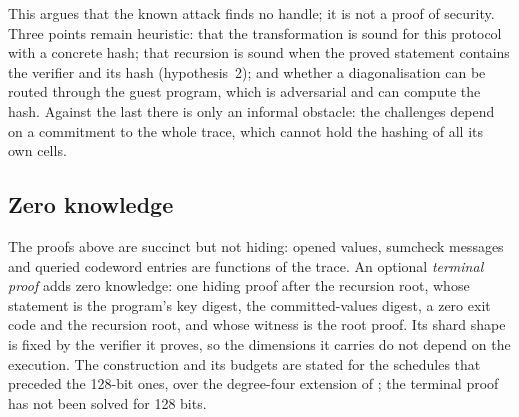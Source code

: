 This argues that the known attack finds no handle; it is not a proof of security. Three points remain heuristic: that the transformation is sound for this protocol with a concrete hash; that recursion is sound when the proved statement contains the verifier and its hash (hypothesis~2); and whether a diagonalisation can be routed through the guest program, which is adversarial and can compute the hash. Against the last there is only an informal obstacle: the challenges depend on a commitment to the whole trace, which cannot hold the hashing of all its own cells.

\subsection{Zero knowledge}
\label{sec:zk}

The proofs above are succinct but not hiding: opened values, sumcheck messages and queried codeword entries are functions of the trace. An optional \emph{terminal proof} adds zero knowledge: one hiding proof after the recursion root, whose statement is the program's key digest, the committed-values digest, a zero exit code and the recursion root, and whose witness is the root proof. Its shard shape is fixed by the verifier it proves, so the dimensions it carries do not depend on the execution. The construction and its budgets are stated for the schedules that preceded the 128-bit ones, over the degree-four extension of \KB{}; the terminal proof has not been solved for 128 bits.


